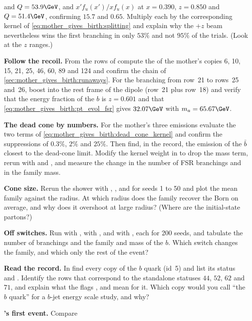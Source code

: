 \begin{exercises}
  and $Q=53.9\GeV$, and $x'f_u(x')/xf_u(x)$ at $x=0.390$, $z=0.850$ and
  $Q=51.4\GeV$, confirming $15.7$ and $0.65$. Multiply each by the
  corresponding kernel of \cref{eq:mother_gives_birth:splitting} and explain
  why the $+z$ beam nevertheless wins the first branching in only $53\%$ and
  not $95\%$ of the trials. (Look at the $z$ ranges.)
\item \textbf{Follow the recoil.} From the rows of 
  compute the \pt of the mother's copies 6, 10, 15, 21, 25, 46, 60, 89 and
  124 and confirm the chain of \cref{sec:mother_gives_birth:runaways}. For
  the branching from row~21 to rows~25 and~26, boost into the rest frame of
  the dipole (row~21 plus row~18) and verify that the energy fraction of the
  $b$ is $z=0.601$ and that
  \cref{eq:mother_gives_birth:pt_evol_fsr} gives $32.07\GeV$ with
  $m_a=65.67\GeV$.
\item \textbf{The dead cone by numbers.} For the mother's three emissions
  evaluate the two terms of \cref{eq:mother_gives_birth:dead_cone_kernel}
  and confirm the suppressions of $0.3\%$, $2\%$ and $25\%$. Then find, in
  the record, the emission of the $\bar b$ closest to the dead-cone limit.
  Modify the kernel weight in  to drop the mass term,
  rerun with  and , and measure the change
  in the number of FSR branchings and in the family mass.
\item \textbf{Cone size.} Rerun the shower with ,
  ,  and  for seeds 1 to 50 and plot the mean
  family \pt against the radius. At which radius does the family recover the
  Born \pt on average, and why does it overshoot at large radius? (Where are
  the initial-state partons?)
\item \textbf{Off switches.} Run with , with
  , and with , each for 200 seeds, and
  tabulate the number of branchings and the family \pt and mass of the $b$.
  Which switch changes the family, and which only the rest of the event?
\item \textbf{Read the \CMSSW record.} In  find
  every copy of the $b$ quark (id~5) and list its status and \pt. Identify
  the rows that correspond to the standalone statuses $44$, $52$, $62$ and
  $71$, and explain what the flags ,
   and  mean for it. Which copy would
  you call ``the $b$ quark'' for a $b$-jet energy scale study, and why?
\item \textbf{\PYTHIA's first event.} Compare

\end{exercises}

